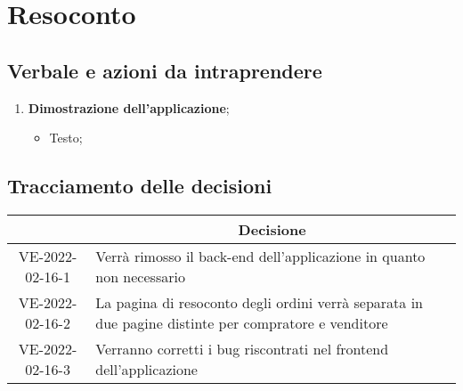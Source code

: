 \section{Resoconto}
\subsection{Verbale e azioni da intraprendere}

\begin{enumerate}
	\item \textbf{Dimostrazione dell'applicazione};
	\begin{itemize}
		\item Testo;
	\end{itemize}
\end{enumerate}

\pagebreak

\subsection{Tracciamento delle decisioni}

\begin{table}[H]
	\centering
	\renewcommand{\arraystretch}{1.8}
	\begin{tabular}{c | p{10cm}}
		\rowcolor[HTML]{125E28}
		\multicolumn{1}{c}{\color[HTML]{FFFFFF} \textbf{ID}} &
		\multicolumn{1}{c}{\color[HTML]{FFFFFF} \textbf{Decisione}} \\
		\hline
		VE-2022-02-16-1 & Verrà rimosso il back-end dell'applicazione in quanto non necessario \\ \hline
		VE-2022-02-16-2 & La pagina di resoconto degli ordini verrà separata in due pagine distinte per compratore e venditore \\ \hline
		VE-2022-02-16-3 & Verranno corretti i bug riscontrati nel frontend dell'applicazione \\
	\end{tabular}
\end{table}